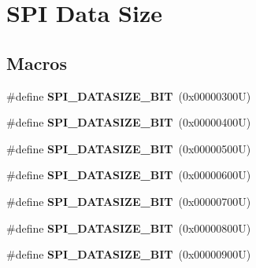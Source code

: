 \hypertarget{group___s_p_i___data___size}{}\section{S\+PI Data Size}
\label{group___s_p_i___data___size}
\subsection*{Macros}
\begin{DoxyCompactItemize}
\item 
\mbox{\label{group___s_p_i___data___size_ga333dd776c2e5bd34a62ec2c778e79b31}} 
\#define {\bfseries S\+P\+I\+\_\+\+D\+A\+T\+A\+S\+I\+Z\+E\+\_\+B\+IT}~(0x00000300\+U)
\item 
\mbox{\label{group___s_p_i___data___size_gac419892f10e003ca1610b02764a9571a}} 
\#define {\bfseries S\+P\+I\+\_\+\+D\+A\+T\+A\+S\+I\+Z\+E\+\_\+B\+IT}~(0x00000400\+U)
\item 
\mbox{\label{group___s_p_i___data___size_ga4ae84231733c205f5824fd04411f4256}} 
\#define {\bfseries S\+P\+I\+\_\+\+D\+A\+T\+A\+S\+I\+Z\+E\+\_\+B\+IT}~(0x00000500\+U)
\item 
\mbox{\label{group___s_p_i___data___size_ga255495a4ed0b621c7febc3381cc126a3}} 
\#define {\bfseries S\+P\+I\+\_\+\+D\+A\+T\+A\+S\+I\+Z\+E\+\_\+B\+IT}~(0x00000600\+U)
\item 
\mbox{\label{group___s_p_i___data___size_ga773e9fc5d44c9661c829361fbd073152}} 
\#define {\bfseries S\+P\+I\+\_\+\+D\+A\+T\+A\+S\+I\+Z\+E\+\_\+B\+IT}~(0x00000700\+U)
\item 
\mbox{\label{group___s_p_i___data___size_ga5aaa20dba9ccfa33b21b5b0412b3b9a4}} 
\#define {\bfseries S\+P\+I\+\_\+\+D\+A\+T\+A\+S\+I\+Z\+E\+\_\+B\+IT}~(0x00000800\+U)
\item 
\mbox{\label{group___s_p_i___data___size_ga45f9441b23fa3975e6a66329e3edc540}} 
\#define {\bfseries S\+P\+I\+\_\+\+D\+A\+T\+A\+S\+I\+Z\+E\+\_\+B\+IT}~(0x00000900\+U)
\item 

\end{DoxyCompactItemize}
